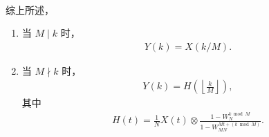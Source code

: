 \begin{solution}
\begin{enumerate}[label=(\arabic*)]
\begin{enumerate}
\begin{align*}
                    \end{align*}
            \end{enumerate}
            综上所述，
            \begin{enumerate}
                \item 当 $M \mid k$ 时，
                    \begin{align*}
                        Y(k) = X(k / M).
                    \end{align*}
                \item 当 $M \nmid k$ 时，
                    \begin{align*}
                        Y(k) = H\left(\left\lfloor\frac{k}{M}\right\rfloor\right),
                    \end{align*}
                    其中
                    \begin{align*}
                        H(t) = \frac{1}{N}X(t) \otimes \frac{1 - W_N^{k \bmod M}}{1 - W_{MN}^{Mt + (k\bmod M)}}.
                    \end{align*}
            \end{enumerate}
    \end{enumerate}
\end{solution}